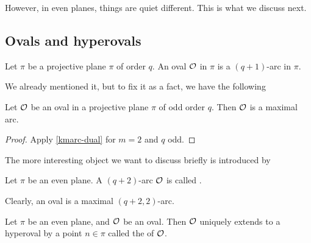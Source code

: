 However, in even planes, things are quiet different.
This is what we discuss next.

\subsection{Ovals and hyperovals}

\begin{definition}[oval]
    Let $\pi$ be a projective plane $\pi$ of order $q$. An oval $\mathcal{O}$ in $\pi$ is a $(q+1)$-arc in $\pi$.  
\end{definition}

We already mentioned it, but to fix it as a fact, we have the following

\begin{lemma} 
    Let $\mathcal{O}$ be an oval in a projective plane $\pi$ of odd order $q$.
    Then $\mathcal{O}$ is a maximal arc.
\end{lemma}

\begin{proof} Apply \autoref{kmarc-dual} for $m=2$ and $q$ odd.
\end{proof}

The more interesting object we want to discuss briefly is introduced by

\begin{definition}[hyperoval]
    Let $\pi$ be an even plane. A $(q+2)$-arc $\mathcal{O}$ is called .
\end{definition}

\begin{remark}
    Clearly, an oval is a maximal $(q+2,2)$-arc.
\end{remark}

\begin{lemma}
    Let $\pi$ be an even plane, and $\mathcal{O}$ be an oval. Then $\mathcal{O}$ uniquely extends to a hyperoval by a point $n\in\pi$ called the  of $\mathcal{O}$.
\end{lemma}

